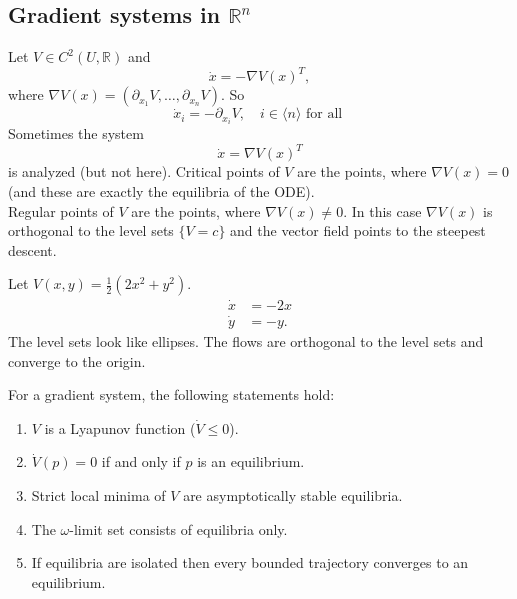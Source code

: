 \documentclass{article}
\newcommand*{\R}{\mathbb{R}}
\newcommand*{\Rn}{{\mathbb{R}^n}}
\newcommand*{\half}[1]{\frac{#1}{2}}
\newcommand*{\jbr}[1]{{\langle #1 \rangle}}
\begin{document}
\subsection{Gradient systems in $\Rn$}

Let  $V \in C^2(U,\R)$ and
$$\dot x = -\nabla V(x)^T,$$
where $\nabla V(x) = (\partial_{x_1} V, \dots, \partial_{x_n} V)$.
So
$$\dot x_i = -\partial_{x_i} V, \quad i \in\jbr{n} \text{ for all }$$
Sometimes the system
$$\dot x = \nabla V(x)^T$$
is analyzed (but not here). Critical points of $V$ are the points, where $\nabla V(x) = 0$ (and these are exactly the equilibria of the ODE).\\
Regular points of $V$ are the points, where $\nabla V(x) \neq 0$. In this case $\nabla V(x)$ is orthogonal to the level sets $\{V = c\}$ and the vector field points to the steepest descent.

\begin{exam}
    Let $V(x,y) = \half1(2x^2+y^2)$.
    $$\begin{aligned}
        \dot x &= -2x\\
        \dot y &= -y.
    \end{aligned}$$
    The level sets look like ellipses. The flows are orthogonal to the level sets and converge to the origin.
\end{exam}

\begin{lem}
    For a gradient system, the following statements hold:
    \begin{enumerate}
        \item $V$ is a Lyapunov function ($\dot V \leq 0$).

        \item $\dot V(p)=0$ if and only if $p$ is an equilibrium.

        \item Strict local minima of $V$ are asymptotically stable equilibria.

        \item The $\omega$-limit set consists of equilibria only.

        \item If equilibria are isolated then every bounded trajectory converges to an equilibrium.
    \end{enumerate}
\end{lem}
\end{document}

